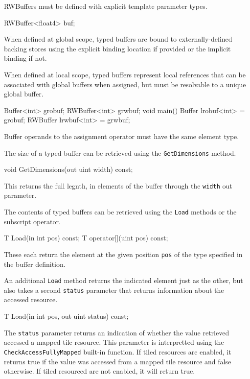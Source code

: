 RWBuffers must be defined with explicit template parameter types.
\begin{HLSL}
  RWBuffer<float4> buf;
\end{HLSL}

When defined at global scope, typed buffers are bound to externally-defined backing stores
using the explicit binding location if provided or the implicit binding if not.

When defined at local scope, typed buffers represent local references
that can be associated with global buffers when assigned,
but must be resolvable to a unique global buffer.

\begin{HLSL}
  Buffer<int> grobuf;
  RWBuffer<int> grwbuf;
  void main() {
    Buffer lrobuf<int> = grobuf;
    RWBuffer lrwbuf<int> = grwbuf;
  }
\end{HLSL}
Buffer operands to the assignment operator must have the same element type.


The size of a typed buffer can be retrieved using the \texttt{GetDimensions} method.
\begin{HLSL}
void GetDimensions(out uint width) const;
\end{HLSL}

This returns the full legnth, in elements of the buffer through the \texttt{width} out parameter.


The contents of typed buffers can be retrieved using the \texttt{Load} methods
or the subscript operator.

\begin{HLSL}
 T Load(in int pos) const;
 T operator[](uint pos) const;
\end{HLSL}

These each return the element at the given position \texttt{pos} of the type specified in the buffer definition.

An additional \texttt{Load} method returns the indicated element just as the other,
but also takes a second \texttt{status} parameter that returns information about the accessed resource.
\begin{HLSL}
 T Load(in int pos, out uint status) const;
\end{HLSL}

The \texttt{status} parameter returns an indication of whether the value retrieved accessed a mapped tile
resource. This parameter is interpretted using the \texttt{CheckAccessFullyMapped}
built-in function. If tiled resources are enabled, it returns true if the value was accessed from a mapped
tile resource and false otherwise. If tiled resourced are not enabled, it will return true.

